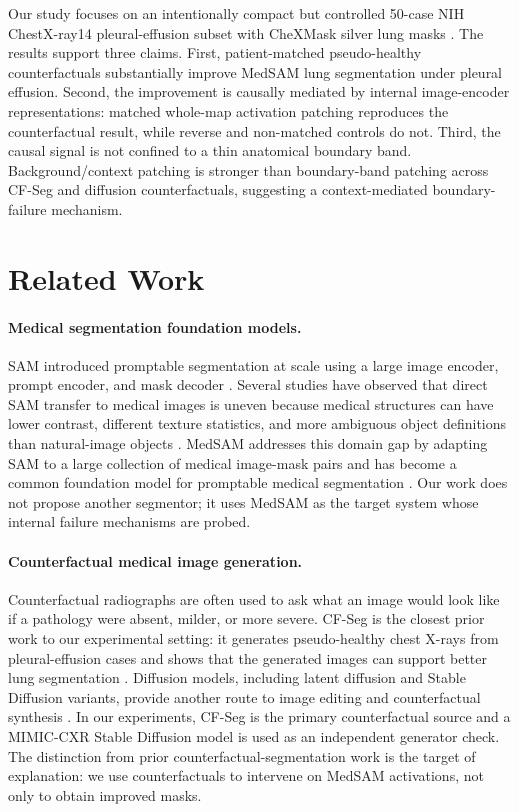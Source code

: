 \documentclass[runningheads]{llncs}
\begin{document}
Our study focuses on an intentionally compact but controlled 50-case NIH ChestX-ray14 pleural-effusion subset with CheXMask silver lung masks \cite{wang2017chestxray8,gaggion2024chexmask,gaggion2025chexmask,goldberger2000physionet}. The results support three claims. First, patient-matched pseudo-healthy counterfactuals substantially improve MedSAM lung segmentation under pleural effusion. Second, the improvement is causally mediated by internal image-encoder representations: matched whole-map activation patching reproduces the counterfactual result, while reverse and non-matched controls do not. Third, the causal signal is not confined to a thin anatomical boundary band. Background/context patching is stronger than boundary-band patching across CF-Seg and diffusion counterfactuals, suggesting a context-mediated boundary-failure mechanism.

\section{Related Work}

\paragraph{Medical segmentation foundation models.}
SAM introduced promptable segmentation at scale using a large image encoder, prompt encoder, and mask decoder \cite{kirillov2023segment}. Several studies have observed that direct SAM transfer to medical images is uneven because medical structures can have lower contrast, different texture statistics, and more ambiguous object definitions than natural-image objects \cite{mazurowski2023sam,huang2024sammedical}. MedSAM addresses this domain gap by adapting SAM to a large collection of medical image-mask pairs and has become a common foundation model for promptable medical segmentation \cite{ma2024medsam}. Our work does not propose another segmentor; it uses MedSAM as the target system whose internal failure mechanisms are probed.

\paragraph{Counterfactual medical image generation.}
Counterfactual radiographs are often used to ask what an image would look like if a pathology were absent, milder, or more severe. CF-Seg is the closest prior work to our experimental setting: it generates pseudo-healthy chest X-rays from pleural-effusion cases and shows that the generated images can support better lung segmentation \cite{mehta2025cfseg}. Diffusion models, including latent diffusion and Stable Diffusion variants, provide another route to image editing and counterfactual synthesis \cite{rombach2022ldm,liang2023pie}. In our experiments, CF-Seg is the primary counterfactual source and a MIMIC-CXR Stable Diffusion model is used as an independent generator check. The distinction from prior counterfactual-segmentation work is the target of explanation: we use counterfactuals to intervene on MedSAM activations, not only to obtain improved masks.
\end{document}
